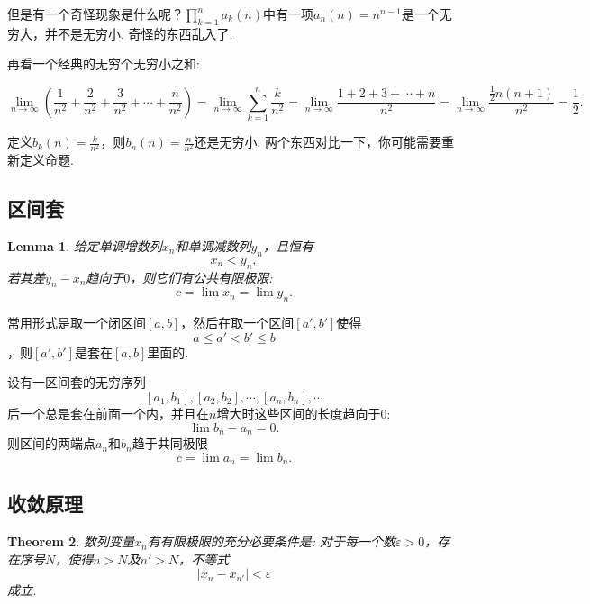 \documentclass{article}
\newtheorem{theorem}{Theorem}[section]
\newtheorem{lemma}[theorem]{Lemma}
\begin{document}
但是有一个奇怪现象是什么呢？$\prod_{k=1}^na_k(n)$中有一项$a_n(n)=n^{n-1}$是一个无穷大，并不是无穷小. 奇怪的东西乱入了.

再看一个经典的无穷个无穷小之和:

$$
\lim_{n\to\infty}\left(\frac1{n^2}+\frac2{n^2}+\frac3{n^2}+\cdots+\frac n{n^2}\right)=\lim_{n\to\infty}\sum_{k=1}^n\frac k{n^2} = \lim_{n\to\infty}\frac{1+2+3+\cdots+n}{n^2}=\lim_{n\to\infty}\frac{\frac12n(n+1)}{n^2}=\frac12.
$$

定义$b_k(n)=\frac k{n^2}$，则$b_n(n)=\frac n{n^2}$还是无穷小. 两个东西对比一下，你可能需要重新定义命题.


\newpage
\subsection{区间套}

\begin{lemma}
给定单调增数列$x_n$和单调减数列$y_n$，且恒有\[x_n < y_n,\]若其差$y_n - x_n$趋向于$0$，则它们有公共有限极限:\[c = \lim x_n  = \lim y_n.\]
\end{lemma}

常用形式是取一个闭区间$[a,b]$，然后在取一个区间$[a',b']$使得\[a \leq a' < b' \leq b\]，则$[a',b']$是套在$[a,b]$里面的.

设有一区间套的无穷序列\[[a_1,b_1],[a_2,b_2],\cdots,[a_n,b_n],\cdots\]后一个总是套在前面一个内，并且在$n$增大时这些区间的长度趋向于$0$:\[\lim b_n - a_n = 0.\]则区间的两端点$a_n$和$b_n$趋于共同极限\[c = \lim a_n = \lim b_n.\]


\newpage
\subsection{收敛原理}

\begin{theorem}
数列变量$x_n$有有限极限的充分必要条件是: 对于每一个数$\varepsilon > 0$，存在序号$N$，使得$n > N$及$n' > N$，不等式\[|x_n - x_{n'}| < \varepsilon\]成立.
\end{theorem}
\end{document}
